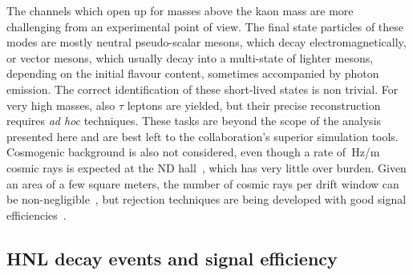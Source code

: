 The channels which open up for masses above the kaon mass are more challenging from an experimental point of view.
The final state particles of these modes are mostly neutral pseudo-scalar mesons, which decay electromagnetically, %
or vector mesons, which usually decay into a multi-state of lighter mesons, depending on the initial flavour content,
sometimes accompanied by photon emission.
The correct identification of these short-lived states is non trivial.
For very high masses, also $\tau$ leptons are yielded, but their precise reconstruction requires \emph{ad hoc} techniques.
These tasks are beyond the scope of the analysis presented here and are best left to the collaboration's superior simulation tools.
Cosmogenic background is also not considered, even though a rate of \,Hz/m cosmic rays %
is expected at the ND hall~\cite{Abi:2020wmh}, which has very little over burden.
Given an area of a few square meters, the number of cosmic rays per drift window can be non-negligible~\cite{Abi:2018dnh}, %
but rejection techniques are being developed with good signal efficiencies~\cite{Adams:2018lzd}.


%
\subsection{HNL decay events and signal efficiency}
\label{sec:numevt}

